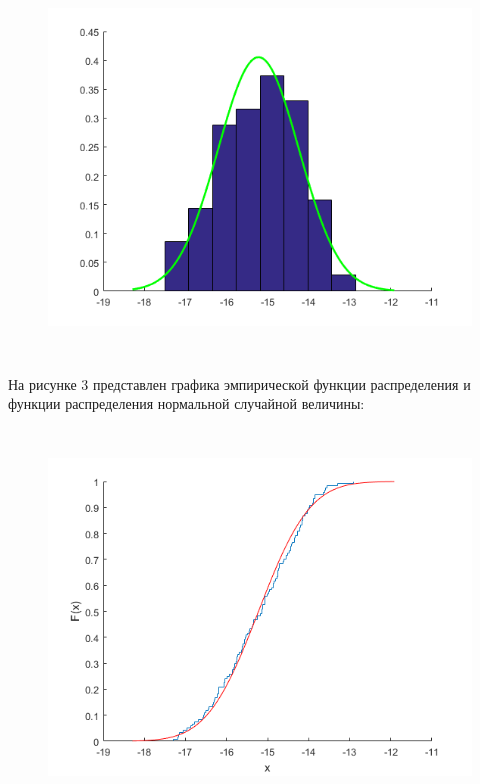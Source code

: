 \begin{figure}[h]
	\begin{center}
		\includegraphics[width=\linewidth, height=10cm]{inc/hist.png}
	\end{center}
\end{figure}
\FloatBarrier

На рисунке 3 представлен  графика эмпирической функции распределения и функции распределения нормальной случайной величины:
\FloatBarrier
\begin{figure}[h]
	\begin{center}
		\includegraphics[width=\linewidth, height=10cm]{inc/cdf.png}
	\end{center}
\end{figure}
\FloatBarrier

